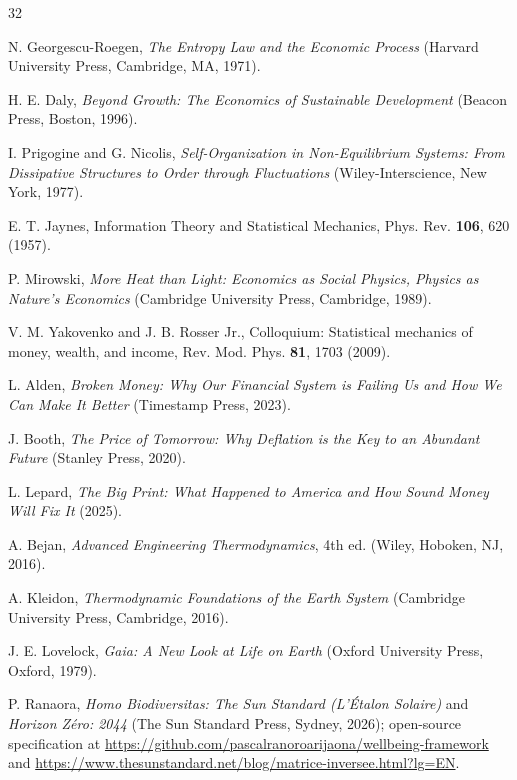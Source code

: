 \documentclass[aps,pre,twocolumn,10pt,superscriptaddress,amsmath,amssymb,amsfonts,floatfix,showkeys]{revtex4-2}
\begin{document}
\begin{thebibliography}{32}

N. Georgescu-Roegen, \textit{The Entropy Law and the Economic Process} (Harvard University Press, Cambridge, MA, 1971).

H. E. Daly, \textit{Beyond Growth: The Economics of Sustainable Development} (Beacon Press, Boston, 1996).

I. Prigogine and G. Nicolis, \textit{Self-Organization in Non-Equilibrium Systems: From Dissipative Structures to Order through Fluctuations} (Wiley-Interscience, New York, 1977).

E. T. Jaynes, Information Theory and Statistical Mechanics, Phys. Rev. \textbf{106}, 620 (1957).

P. Mirowski, \textit{More Heat than Light: Economics as Social Physics, Physics as Nature's Economics} (Cambridge University Press, Cambridge, 1989).

V. M. Yakovenko and J. B. Rosser Jr., Colloquium: Statistical mechanics of money, wealth, and income, Rev. Mod. Phys. \textbf{81}, 1703 (2009).

L. Alden, \textit{Broken Money: Why Our Financial System is Failing Us and How We Can Make It Better} (Timestamp Press, 2023).

J. Booth, \textit{The Price of Tomorrow: Why Deflation is the Key to an Abundant Future} (Stanley Press, 2020).

L. Lepard, \textit{The Big Print: What Happened to America and How Sound Money Will Fix It} (2025).

A. Bejan, \textit{Advanced Engineering Thermodynamics}, 4th ed. (Wiley, Hoboken, NJ, 2016).

A. Kleidon, \textit{Thermodynamic Foundations of the Earth System} (Cambridge University Press, Cambridge, 2016).

J. E. Lovelock, \textit{Gaia: A New Look at Life on Earth} (Oxford University Press, Oxford, 1979).

P. Ranaora, \textit{Homo Biodiversitas: The Sun Standard (L'\'Etalon Solaire)} and \textit{Horizon Z\'ero: 2044} (The Sun Standard Press, Sydney, 2026); open-source specification at \url{https://github.com/pascalranoroarijaona/wellbeing-framework} and \url{https://www.thesunstandard.net/blog/matrice-inversee.html?lg=EN}.


\end{thebibliography}
\end{document}
